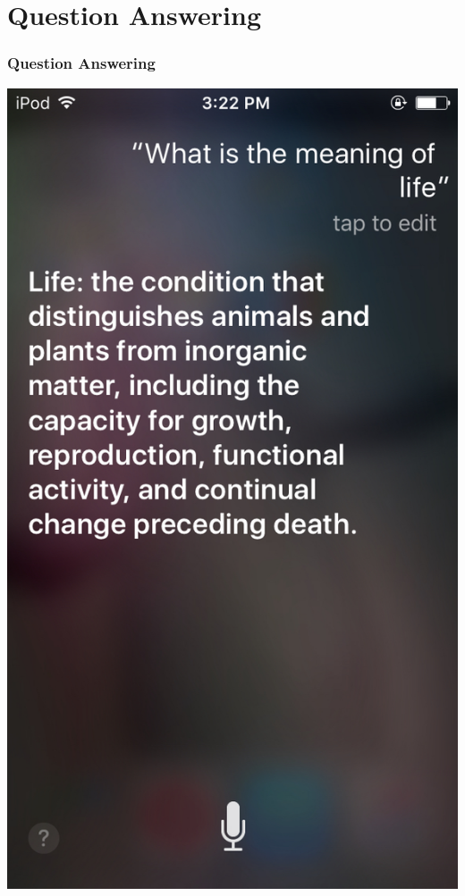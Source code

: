 \documentclass{beamer}
\begin{document}
	
	
\section{Question Answering}
\begin{frame}
	\frametitle{Question Answering}		
		
		
		\begin{center}
			\centering
				\includegraphics[width=\textwidth,height=0.8\textheight,keepaspectratio]{siri}
				\vspace{0.5cm}
		\end{center}			
		
			
\end{frame}
	
\end{document}
